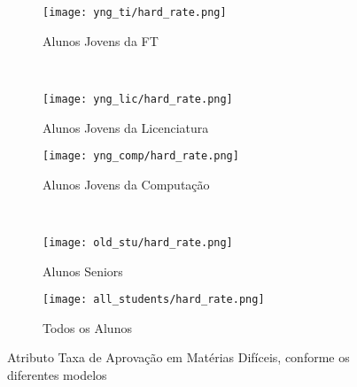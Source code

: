 \clearpage
\begin{figure}[!ht]
    \centering
    \begin{subfigure}[b]{0.48\textwidth}
        \centering
        \texttt{[image: yng\_ti/hard\_rate.png]}
        \caption{Alunos Jovens da FT}
    \end{subfigure}
    ~
    \begin{subfigure}[b]{0.48\textwidth}
        \centering
        \texttt{[image: yng\_lic/hard\_rate.png]}
        \caption{Alunos Jovens da Licenciatura}
    \end{subfigure}

    \begin{subfigure}[b]{0.48\textwidth}
        \centering
        \texttt{[image: yng\_comp/hard\_rate.png]}
        \caption{Alunos Jovens da Computação}
    \end{subfigure}
    ~
    \begin{subfigure}[b]{0.48\textwidth}
        \centering
        \texttt{[image: old\_stu/hard\_rate.png]}
        \caption{Alunos Seniors}
    \end{subfigure}

    \begin{subfigure}[b]{0.48\textwidth}
        \centering
        \texttt{[image: all\_students/hard\_rate.png]}
        \caption{Todos os Alunos}
    \end{subfigure}
    \caption{Atributo Taxa de Aprovação em Matérias Difíceis, conforme os diferentes modelos}
\end{figure}

